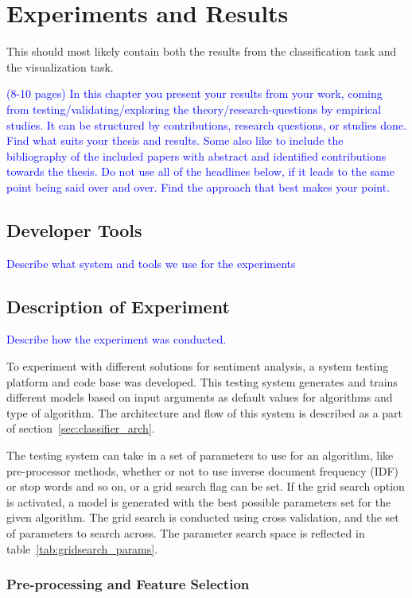\chapter{Experiments and Results}

This should most likely contain both the results from the classification task and the visualization task.

\textcolor{blue}{(8-10 pages) In this chapter you present your results from your work, coming from 
testing/validating/exploring the theory/research-questions by empirical studies. It can be structured by contributions, 
research questions, or studies done. Find what suits your thesis and results. Some also like to include the 
bibliography of the included papers with abstract and identified contributions towards the thesis. Do not use all of 
the headlines below, if it leads to the same point being said over and over. Find the approach that best makes your 
point.}

\section{Developer Tools}
\textcolor{blue}{Describe what system and tools we use for the experiments}


\section{Description of Experiment}
\textcolor{blue}{Describe how the experiment was conducted.}

To experiment with different solutions for sentiment analysis, a system testing platform and code base was developed. This testing system generates and trains different models based on input arguments as default values for algorithms and type of algorithm. The architecture and flow of this system is described as a part of section~\ref{sec:classifier_arch}.

The testing system can take in a set of parameters to use for an algorithm, like pre-processor methods, whether or not to use inverse document frequency (IDF) or stop words and so on, or a grid search flag can be set. If the grid search option is activated, a model is generated with the best possible parameters set for the given algorithm. The grid search is conducted using cross validation, and the set of parameters to search across. The parameter search space is reflected in table~\ref{tab:gridsearch_params}.


\subsection{Pre-processing and Feature Selection}

